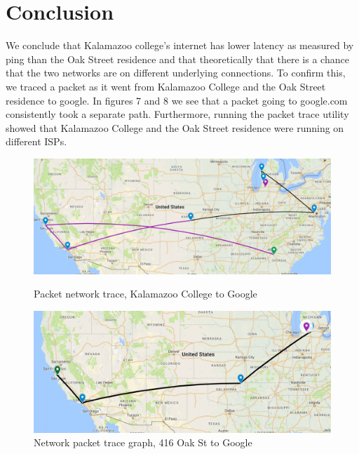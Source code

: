 \documentclass{article}
\begin{document}
\section{Conclusion}
We conclude that Kalamazoo college's internet has lower latency as measured by ping than the Oak Street residence and that theoretically that there is a chance that the two networks are on different underlying connections. To confirm this, we traced a packet as it went from Kalamazoo College and the Oak Street residence to google. In figures 7 and 8 we see that a packet going to google.com consistently took a separate path. Furthermore, running the packet trace utility showed that Kalamazoo College and the Oak Street residence were running on different ISPs.
\begin{figure}
    \centering
    \begin{minipage}{.45\textwidth}
        \centering
        \includegraphics[width=\linewidth, height=0.15\textheight]{NetworkMapHome2.png}
        \caption{Packet network trace, Kalamazoo College to Google}
        \label{fig:prob1_6_2}
    \end{minipage}%
    \hspace{0.05\linewidth}
    \begin{minipage}{0.45\textwidth}
        \centering
        \includegraphics[width=\linewidth, height=0.15\textheight]{NetworkMapSchool.png}
        \caption{Network packet trace graph, 416 Oak St to Google}
        \label{fig:prob1_6_1}
    \end{minipage}
\end{figure}
\end{document}
